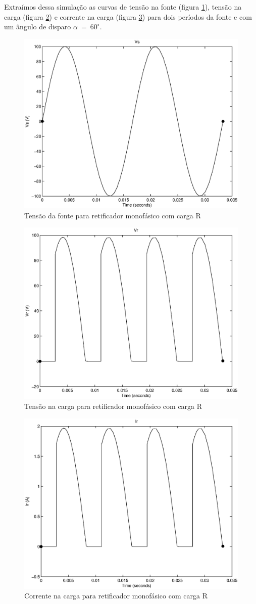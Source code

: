 \documentclass{report}
\begin{document}
Extraímos dessa simulação as curvas de tensão na fonte (figura \ref{fig:rvs}), tensão na carga (figura \ref{fig:rvr}) e corrente na carga (figura \ref{fig:rir}) para dois períodos da fonte e com um ângulo de disparo $\alpha\ =\ 60^\circ$.
\begin{figure}[H]
	\centering
	\includegraphics[width=0.7\linewidth]{matlab/r_vs}
	\caption{Tensão da fonte para retificador monofásico com carga R}
	\label{fig:rvs}
\end{figure}
\begin{figure}[H]
	\centering
	\includegraphics[width=0.7\linewidth]{matlab/r_vr}
	\caption{Tensão na carga para retificador monofásico com carga R}
	\label{fig:rvr}
\end{figure}
\begin{figure}[H]
	\centering
	\includegraphics[width=0.7\linewidth]{matlab/r_ir}
	\caption{Corrente na carga para retificador monofásico com carga R}
	\label{fig:rir}
\end{figure}
\end{document}
